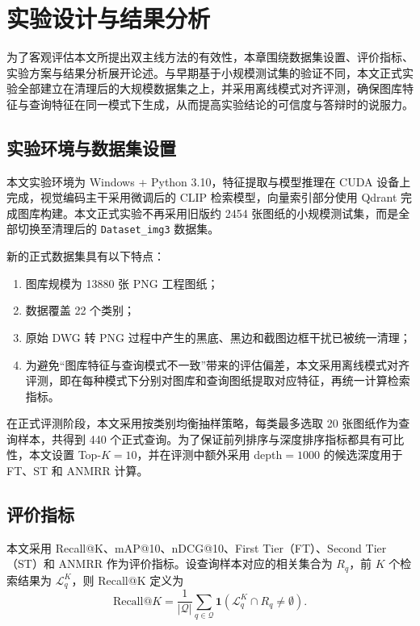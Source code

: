 \chapter{实验设计与结果分析}

为了客观评估本文所提出双主线方法的有效性，本章围绕数据集设置、评价指标、实验方案与结果分析展开论述。与早期基于小规模测试集的验证不同，本文正式实验全部建立在清理后的大规模数据集之上，并采用离线模式对齐评测，确保图库特征与查询特征在同一模式下生成，从而提高实验结论的可信度与答辩时的说服力。

\section{实验环境与数据集设置}

本文实验环境为 Windows + Python 3.10，特征提取与模型推理在 CUDA 设备上完成，视觉编码主干采用微调后的 CLIP 检索模型，向量索引部分使用 Qdrant 完成图库构建。本文正式实验不再采用旧版约 2454 张图纸的小规模测试集，而是全部切换至清理后的 \texttt{Dataset\_img3} 数据集。

新的正式数据集具有以下特点：
\begin{enumerate}
  \item 图库规模为 13880 张 PNG 工程图纸；
  \item 数据覆盖 22 个类别；
  \item 原始 DWG 转 PNG 过程中产生的黑底、黑边和截图边框干扰已被统一清理；
  \item 为避免“图库特征与查询模式不一致”带来的评估偏差，本文采用离线模式对齐评测，即在每种模式下分别对图库和查询图纸提取对应特征，再统一计算检索指标。
\end{enumerate}

在正式评测阶段，本文采用按类别均衡抽样策略，每类最多选取 20 张图纸作为查询样本，共得到 440 个正式查询。为了保证前列排序与深度排序指标都具有可比性，本文设置 Top-$K=10$，并在评测中额外采用 depth$=1000$ 的候选深度用于 FT、ST 和 ANMRR 计算。

\section{评价指标}

本文采用 Recall@K、mAP@10、nDCG@10、First Tier（FT）、Second Tier（ST）和 ANMRR 作为评价指标。设查询样本对应的相关集合为 $R_q$，前 $K$ 个检索结果为 $\mathcal{L}_q^K$，则 Recall@K 定义为
\begin{equation}
  \text{Recall@}K = \frac{1}{|\mathcal{Q}|}\sum_{q\in\mathcal{Q}} \mathbf{1}\!\left(\mathcal{L}_q^K \cap R_q \neq \emptyset\right).
\end{equation}

